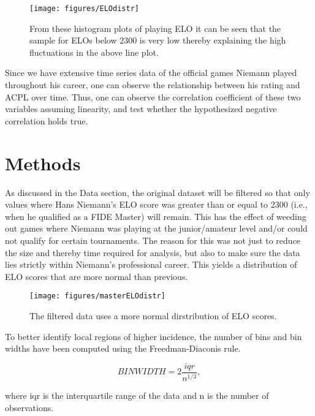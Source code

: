 \documentclass[12pt, letterpaper, titlepage]{article}
\begin{document}
\begin{figure}[!htb]
    \centering
    \texttt{[image: figures/ELOdistr]}
    \caption{From these histogram plots of playing ELO it can be seen that the sample for ELOs below 2300 is very low thereby explaining the high fluctuations in the above line plot.}
    \label{fig:elo_histplot}
\end{figure}

Since we have extensive time series data of the official games Niemann played throughout his career, one can observe the relationship between his rating and ACPL over time. Thus, one can observe the correlation coefficient of these two variables assuming linearity, and test whether the hypothesized negative correlation holds true.

\section*{Methods}
\label{sec:meth}

As discussed in the Data section, the original dataset will be filtered so that only values where Hans Niemann's ELO score was greater than or equal to 2300 (i.e., when he qualified as a FIDE Master) will remain. This has the effect of weeding out games where Niemann was playing at the junior/amateur level and/or could not qualify for certain tournaments. The reason for this was not just to reduce the size and thereby time required for analysis, but also to make sure the data lies strictly within Niemann's professional career. This yields a distribution of ELO scores that are more normal than previous.

\begin{figure}[!htb]
    \centering
    \texttt{[image: figures/masterELOdistr]}
    \caption{The filtered data uses a more normal dirstribution of ELO scores.}
    \label{fig:elogt23_histplot}
\end{figure}

To better identify local regions of higher incidence, the number of bins and bin widths have been computed using the Freedman-Diaconis rule.

\begin{equation}
    \label{eq:freedman-diaconis}
    BIN WIDTH = 2 \frac{iqr}{n^{1/3}},
\end{equation}

where iqr is the interquartile range of the data and n is the number of observations.
\end{document}
